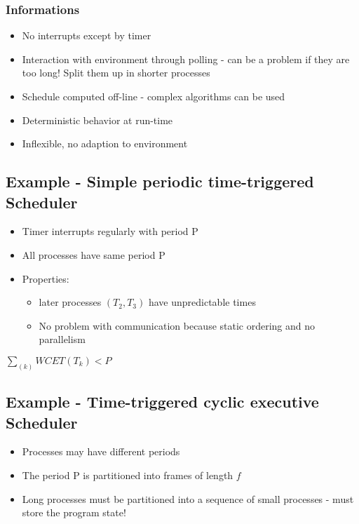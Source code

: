 \subsubsection{Informations}
\begin{itemize}[noitemsep]
\item No interrupts except by timer
\item Interaction with environment through polling - can be a problem if they are too long! Split them up in shorter processes
\item Schedule computed off-line - complex algorithms can be used
\item Deterministic behavior at run-time
\item Inflexible, no adaption to environment
\end{itemize}

\subsection{Example - Simple periodic time-triggered Scheduler}

\begin{itemize}[noitemsep]
\item Timer interrupts regularly with period P
\item All processes have same period P
\item Properties:
		\begin{itemize}
		\item later processes $(T_2, T_3)$ have unpredictable times
		\item No problem with communication because static ordering and no parallelism 
		\end{itemize}
\end{itemize}

\begin{theorem}

$\sum_{ (k) } WCET(T_k) < P$

\end{theorem}


\subsection{Example - Time-triggered cyclic executive Scheduler}

\begin{itemize}[noitemsep]
\item Processes may have different periods
\item The period P is partitioned into frames of length $f$
\item Long processes must be partitioned into a sequence of small processes - must store the program state!
\end{itemize}


